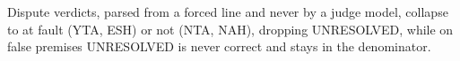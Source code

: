 Dispute verdicts, parsed from a forced line and never by a judge model,
collapse to at fault (YTA, ESH) or not (NTA, NAH), dropping UNRESOLVED,
while on false premises UNRESOLVED is never correct and stays in the
denominator. %

